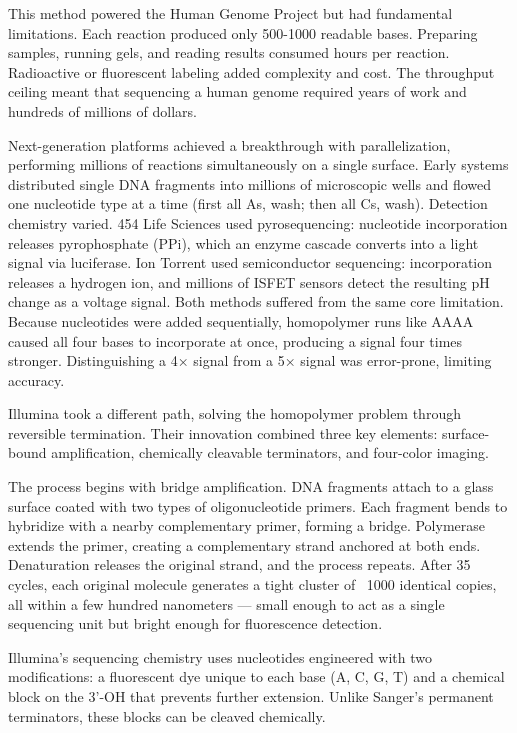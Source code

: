 This method powered the Human Genome Project but had fundamental limitations. Each reaction produced only 500-1000 readable bases. Preparing samples, running gels, and reading results consumed hours per reaction. Radioactive or fluorescent labeling added complexity and cost. The throughput ceiling meant that sequencing a human genome required years of work and hundreds of millions of dollars.

Next-generation platforms achieved a breakthrough with parallelization, performing millions of reactions simultaneously on a single surface. Early systems distributed single DNA fragments into millions of microscopic wells and flowed one nucleotide type at a time (first all As, wash; then all Cs, wash). Detection chemistry varied. 454 Life Sciences used pyrosequencing: nucleotide incorporation releases pyrophosphate (PPi), which an enzyme cascade converts into a light signal via luciferase. Ion Torrent used semiconductor sequencing: incorporation releases a hydrogen ion, and millions of ISFET sensors detect the resulting pH change as a voltage signal. Both methods suffered from the same core limitation. Because nucleotides were added sequentially, homopolymer runs like AAAA caused all four bases to incorporate at once, producing a signal four times stronger. Distinguishing a 4× signal from a 5× signal was error-prone, limiting accuracy.

Illumina took a different path, solving the homopolymer problem through reversible termination. Their innovation combined three key elements: surface-bound amplification, chemically cleavable terminators, and four-color imaging.

The process begins with bridge amplification. DNA fragments attach to a glass surface coated with two types of oligonucleotide primers. Each fragment bends to hybridize with a nearby complementary primer, forming a bridge. Polymerase extends the primer, creating a complementary strand anchored at both ends. Denaturation releases the original strand, and the process repeats. After 35 cycles, each original molecule generates a tight cluster of ~1000 identical copies, all within a few hundred nanometers — small enough to act as a single sequencing unit but bright enough for fluorescence detection.

Illumina's sequencing chemistry uses nucleotides engineered with two modifications: a fluorescent dye unique to each base (A, C, G, T) and a chemical block on the 3'-OH that prevents further extension. Unlike Sanger's permanent terminators, these blocks can be cleaved chemically.

